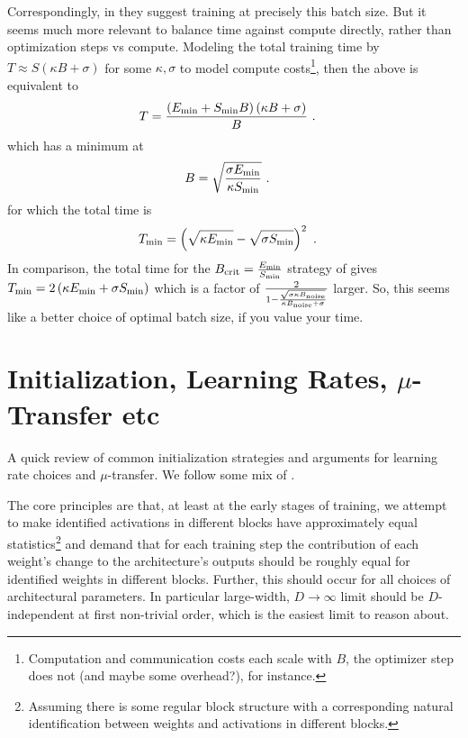 Correspondingly, in \cite{mccandlish2018empirical} they suggest training at precisely this batch
size.  But it seems much more relevant to balance time against compute directly, rather than
optimization steps vs compute. Modeling the total training time by $ T\approx S \left ( \kappa B + \sigma  \right)$
for some $ \kappa ,\sigma  $ to model compute costs\footnote{Computation and communication costs
	each scale with $ B $, the optimizer step does not (and maybe some overhead?), for instance.}, then
the above is equivalent to
\begin{align}
	T & = \frac{\left ( E _{ {\rm min} } + S _{ {\rm min} } B \right) \left ( \kappa B+ \sigma   \right ) }{  B  }\ .
\end{align}
which has a minimum at
\begin{align}
	B & = \sqrt{\frac{ \sigma E _{ {\rm min} } }{ \kappa S _{ {\rm min} }   }}\ .
\end{align}
for which the total time is
\begin{align}
	T _{ {\rm  min} } & = \left ( \sqrt{\kappa E _{ {\rm  min} }} - \sqrt{\sigma S _{ {\rm min} }} \right ) ^{ 2 }\ .
\end{align}
In comparison, the total time for the $ B _{ {\rm  crit} } = \frac{ E _{ {\rm min} } }{ S _{ {\rm
						min} } } $ strategy of \cite{mccandlish2018empirical} gives $ T _{ {\rm  min} } = 2 \left ( \kappa E
	_{ {\rm min} } + \sigma S _{ {\rm min} } \right ) $ which is a factor of $ \frac{ 2 }{ 1- \frac{
			\sqrt{\sigma \kappa B _{ {\rm noise} } } }{ \kappa B _{ {\rm noise}  } + \sigma } } $ larger.
So, this seems like a better choice of optimal batch size, if you value your time.


\section{Initialization, Learning Rates, $ \mu $-Transfer etc \label{app_init_lr_mup}}

A quick review of common initialization strategies and arguments for learning rate choices and $ \mu
$-transfer. We follow some mix of  \cite{physicalDL, yang2022tensor,
yaida2022metaprincipledfamilyhyperparameterscaling,doshi2023criticalinitializationwidedeep}.

The core principles are that, at least at the early stages of training, we attempt to make
identified activations in different blocks have approximately equal statistics\footnote{Assuming
there is some regular block structure with a corresponding natural identification between weights
and activations in different blocks.}  and demand that for each training step the contribution of
each weight's change to the architecture's outputs should be roughly equal for identified weights in
different blocks. Further, this should occur for all choices of architectural parameters. In
particular large-width, $ D \longrightarrow \infty $ limit should be $ D $-independent at first
non-trivial order, which is the easiest limit to reason about.

